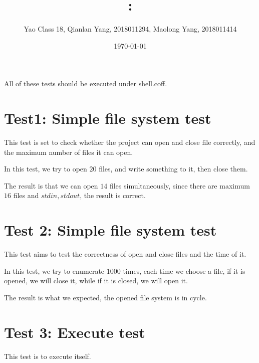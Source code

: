 \documentclass[11pt]{article}
\title{\textmd{\bf \Class: \Title}}
\date{\today}
\author{Yao Class 18, Qianlan Yang, 2018011294, Maolong Yang, 2018011414}
\begin{document}
\begin{spacing}{1.1}
\maketitle \thispagestyle{empty}







\iffalse

\begin{figure}[h]%
	\centering  %
	\texttt{[image: image.jpg]}  %
\end{figure}

\fi

All of these tests should be executed under shell.coff.

\section{Test1: Simple file system test}

This test is set to check whether the project can open and close file correctly, and the maximum number of files it can open.

In this test, we try to open $20$ files, and write something to it, then close them.

The result is that we can open $14$ files simultaneously, since there are maximum $16$ files and $stdin,stdout$, the result is correct. 


\section{Test 2: Simple file system test}

This test aims to test the correctness of open and close files and the time of it.

In this test, we try to enumerate $1000$ times, each time we choose a file, if it is opened, we will close it, while if it is closed, we will open it.

The result is what we expected, the opened file system is in cycle.

\section{Test 3: Execute test}

This test is to execute itself.


\end{spacing}
\end{document}
